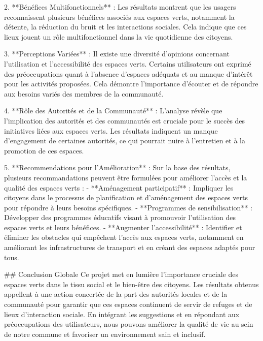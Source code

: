 2. **Bénéfices Multifonctionnels** :
   Les résultats montrent que les usagers reconnaissent plusieurs bénéfices associés aux espaces verts, notamment la détente, la réduction du bruit et les interactions sociales. Cela indique que ces lieux jouent un rôle multifonctionnel dans la vie quotidienne des citoyens.

3. **Perceptions Variées** :
   Il existe une diversité d'opinions concernant l'utilisation et l'accessibilité des espaces verts. Certains utilisateurs ont exprimé des préoccupations quant à l'absence d'espaces adéquats et au manque d'intérêt pour les activités proposées. Cela démontre l'importance d'écouter et de répondre aux besoins variés des membres de la communauté.

4. **Rôle des Autorités et de la Communauté** :
   L'analyse révèle que l'implication des autorités et des communautés est cruciale pour le succès des initiatives liées aux espaces verts. Les résultats indiquent un manque d'engagement de certaines autorités, ce qui pourrait nuire à l'entretien et à la promotion de ces espaces.

5. **Recommendations pour l'Amélioration** :
   Sur la base des résultats, plusieurs recommandations peuvent être formulées pour améliorer l'accès et la qualité des espaces verts :
   - **Aménagement participatif** : Impliquer les citoyens dans le processus de planification et d'aménagement des espaces verts pour répondre à leurs besoins spécifiques.
   - **Programmes de sensibilisation** : Développer des programmes éducatifs visant à promouvoir l'utilisation des espaces verts et leurs bénéfices.
   - **Augmenter l'accessibilité** : Identifier et éliminer les obstacles qui empêchent l'accès aux espaces verts, notamment en améliorant les infrastructures de transport et en créant des espaces adaptés pour tous.

## Conclusion Globale
Ce projet met en lumière l'importance cruciale des espaces verts dans le tissu social et le bien-être des citoyens. Les résultats obtenus appellent à une action concertée de la part des autorités locales et de la communauté pour garantir que ces espaces continuent de servir de refuges et de lieux d'interaction sociale. En intégrant les suggestions et en répondant aux préoccupations des utilisateurs, nous pouvons améliorer la qualité de vie au sein de notre commune et favoriser un environnement sain et inclusif.

